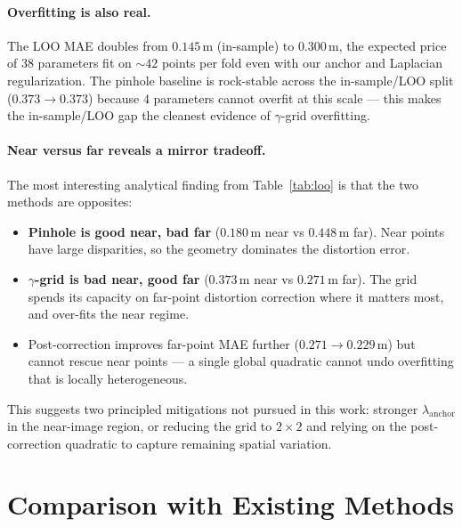 \documentclass[11pt]{article}
\begin{document}
\paragraph{Overfitting is also real.} The LOO MAE doubles from $0.145$\,m (in-sample) to
$0.300$\,m, the expected price of $38$ parameters fit on $\sim 42$ points per fold even
with our anchor and Laplacian regularization. The pinhole baseline is rock-stable across
the in-sample/LOO split ($0.373 \to 0.373$) because $4$ parameters cannot overfit at this
scale --- this makes the in-sample/LOO gap the cleanest evidence of $\gamma$-grid
overfitting.

\paragraph{Near versus far reveals a mirror tradeoff.} The most interesting analytical
finding from Table~\ref{tab:loo} is that the two methods are opposites:
\begin{itemize}[leftmargin=2em]
  \item \textbf{Pinhole is good near, bad far} ($0.180$\,m near vs $0.448$\,m far). Near
        points have large disparities, so the geometry dominates the distortion error.
  \item \textbf{$\gamma$-grid is bad near, good far} ($0.373$\,m near vs $0.271$\,m far).
        The grid spends its capacity on far-point distortion correction where it matters
        most, and over-fits the near regime.
  \item Post-correction improves far-point MAE further ($0.271 \to 0.229$\,m) but cannot
        rescue near points --- a single global quadratic cannot undo overfitting that is
        locally heterogeneous.
\end{itemize}
This suggests two principled mitigations not pursued in this work: stronger
$\lambda_\text{anchor}$ in the near-image region, or reducing the grid to $2 \times 2$
and relying on the post-correction quadratic to capture remaining spatial variation.

\section{Comparison with Existing Methods}
\end{document}
